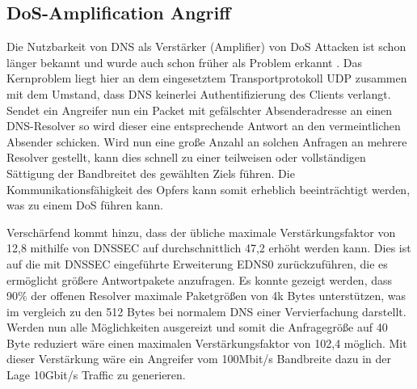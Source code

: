 \subsection{DoS-Amplification Angriff}
\label{sec:attack-dosamp}
Die Nutzbarkeit von DNS als Verstärker (Amplifier) von DoS Attacken ist schon länger bekannt und wurde auch schon früher als Problem erkannt \cite{ICANN2006}. Das Kernproblem liegt hier an dem eingesetztem Transportprotokoll UDP zusammen mit dem Umstand, dass DNS keinerlei Authentifizierung des Clients verlangt. Sendet ein Angreifer nun ein Packet mit gefälschter Absenderadresse an einen DNS-Resolver so wird dieser eine entsprechende Antwort an den vermeintlichen Absender schicken. Wird nun eine große Anzahl an solchen Anfragen an mehrere Resolver gestellt, kann dies schnell zu einer teilweisen oder vollständigen Sättigung der Bandbreitet des gewählten Ziels führen. Die Kommunikationsfähigkeit des Opfers kann somit erheblich beeinträchtigt werden, was zu einem DoS führen kann. 

Verschärfend kommt hinzu, dass der übliche maximale Verstärkungsfaktor von 12,8 mithilfe von DNSSEC auf durchschnittlich 47,2 erhöht werden kann. Dies ist auf die mit DNSSEC eingeführte Erweiterung EDNS0 zurückzuführen, die es ermöglicht größere Antwortpakete anzufragen. Es konnte gezeigt werden, dass 90\% der offenen Resolver maximale Paketgrößen von 4k Bytes unterstützen, was im vergleich zu den 512 Bytes bei normalem DNS einer Vervierfachung darstellt. Werden nun alle Möglichkeiten ausgereizt und somit die Anfragegröße auf 40 Byte reduziert wäre einen maximalen Verstärkungsfaktor von 102,4 möglich\cite{VanRijswijk-Deij2014}. Mit dieser Verstärkung wäre ein Angreifer vom 100Mbit/s Bandbreite dazu in der Lage 10Gbit/s Traffic zu generieren.

